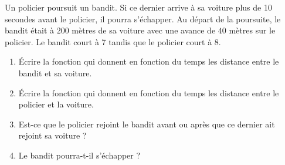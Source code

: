 
\begin{exercice}\label{exosmath-0157}

    Un policier poursuit un bandit. Si ce dernier arrive à sa voiture plus de 10 secondes avant le policier, il pourra s'échapper. Au départ de la poursuite, le bandit était à \( 200\) mètres de sa voiture avec une avance de \( 40\) mètres sur le policier. Le bandit court à \unit{7}{\meter\per\second} tandis que le policier court à \unit{8}{\meter\per\second}.
    \begin{enumerate}
        \item
            Écrire la fonction qui donnent en fonction du temps les distance entre le bandit et sa voiture.
        \item
            Écrire la fonction qui donnent en fonction du temps les distance entre le policier et la voiture.
        \item
            Est-ce que le policier rejoint le bandit avant ou après que ce dernier ait rejoint sa voiture ?
        \item
            Le bandit pourra-t-il s'échapper ?
    \end{enumerate}
\end{exercice}
